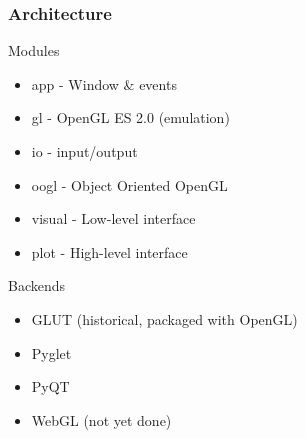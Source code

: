 \documentclass[10pt]{beamer}
\begin{document}
\begin{frame}
  \frametitle{Architecture}

  \begin{block}{Modules}
    \begin{itemize}
    \item app - Window \& events
    \item gl - OpenGL ES 2.0 (emulation)
    \item io -  input/output
    \item oogl - Object Oriented OpenGL
    \item visual - Low-level interface
    \item plot - High-level interface
    \end{itemize}
  \end{block}

  \begin{block}{Backends}
    \begin{itemize}
      \item GLUT (historical, packaged with OpenGL)
      \item Pyglet
      \item PyQT
      \item WebGL (not yet done)
    \end{itemize}
  \end{block}

  \begin{block}{}
  \end{block}

\end{frame}
\end{document}

